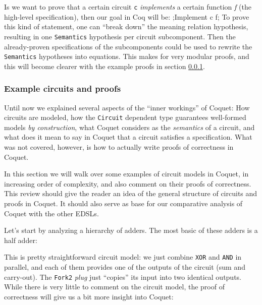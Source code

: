             Is we want to prove that a certain circuit \texttt{c} \emph{implements} a certain
            function \emph{f} (the high-level specification), then our goal in Coq will be:
            \coq;Implement c f; To prove this kind of statement, one can ``break down'' the meaning
            relation hypothesis, resulting in one \texttt{Semantics} hypothesis per circuit
            subcomponent.  Then the already-proven specifications of the subcomponents could be used
            to rewrite the \texttt{Semantics} hypotheses into equations. This makes for very modular
            proofs, and this will become clearer with the example proofs in section
            \ref{subsubsec:coquet-circuits}.


        \subsubsection{Example circuits and proofs}
        \label{subsubsec:coquet-circuits}
            Until now we explained several aspects of the ``inner workings'' of Coquet: How
            circuits are modeled, how the \texttt{Circuit} dependent type guarantees well-formed
            models \emph{by construction}, what Coquet considers as the \emph{semantics} of a
            circuit, and what does it mean to say in Coquet that a circuit satisfies a
            specification. What was not covered, however, is how to actually write proofs of
            correctness in Coquet.

            In this section we will walk over some examples of circuit models in Coquet, in
            increasing order of complexity, and also comment on their proofs of correctness. This
            review should give the reader an idea of the general structure of circuits and proofs in
            Coquet. It should also serve as base for our comparative analysis of Coquet with the
            other EDSLs.

            Let's start by analyzing a hierarchy of adders. The most basic of these adders is a half
            adder:


            This is pretty straightforward circuit model: we just combine \texttt{XOR} and
            \texttt{AND} in parallel, and each of them provides one of the outputs of the circuit
            (sum and carry-out). The \texttt{Fork2} \emph{plug} just ``copies'' its input into two
            identical outputs. While there is very little to comment on the circuit model, the proof
            of correctness will give us a bit more insight into Coquet:

